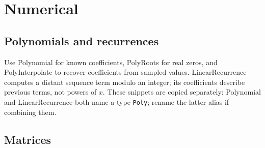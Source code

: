 \chapter{Numerical}

\section{Polynomials and recurrences}
  Use Polynomial for known coefficients, PolyRoots for real zeros, and PolyInterpolate
  to recover coefficients from sampled values. LinearRecurrence computes a distant sequence
  term modulo an integer; its coefficients describe previous terms, not powers of $x$.
  These snippets are copied separately: Polynomial and LinearRecurrence both name a type
  \texttt{Poly}; rename the latter alias if combining them.

\section{Matrices}
  \begingroup
  \endgroup
